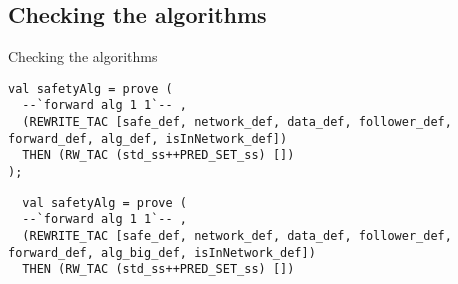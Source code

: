 \documentclass[10pt,a4paper]{beamer}
\begin{document}
\subsection{Checking the algorithms}

\begin{frame}[fragile]{Checking the algorithms}

\begin{lstlisting}
val safetyAlg = prove (
  --`forward alg 1 1`-- ,
  (REWRITE_TAC [safe_def, network_def, data_def, follower_def, forward_def, alg_def, isInNetwork_def])
  THEN (RW_TAC (std_ss++PRED_SET_ss) [])
);
\end{lstlisting}
\begin{lstlisting}
  val safetyAlg = prove (
  --`forward alg 1 1`-- ,
  (REWRITE_TAC [safe_def, network_def, data_def, follower_def, forward_def, alg_big_def, isInNetwork_def])
  THEN (RW_TAC (std_ss++PRED_SET_ss) [])


\end{lstlisting}

\end{frame}
	
\end{document}
